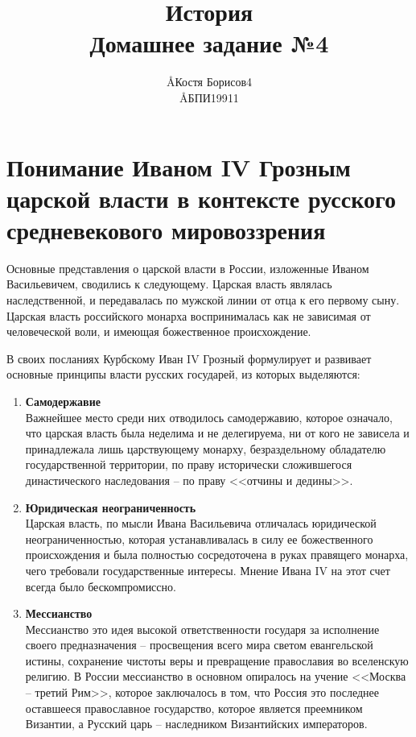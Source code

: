 \documentclass[12pt]{article}
\title{История \\ Домашнее задание №4}
\author{\AA{Костя Борисов}{4} \\ \AA{БПИ199}{11}}
\newcommand{\red}[1]{{\color{red}{#1}}}
\begin{document}
  \maketitle
  \setcounter{section}{1}

  \section{Понимание Иваном IV Грозным царской власти в контексте русского средневекового мировоззрения}

  Основные представления о царской власти в России, изложенные Иваном Васильевичем, сводились к следующему.
  Царская власть являлась наследственной, и передавалась по мужской линии от отца к его первому сыну.
  Царская власть российского монарха воспринималась как не зависимая от человеческой воли, и имеющая божественное происхождение.

  В своих посланиях Курбскому Иван IV Грозный формулирует и развивает основные принципы власти русских государей, из которых выделяются:

  \begin{enumerate}[label=\textbf{\large\arabic*}]
    \item {\bf\large Самодержавие} \\
    Важнейшее место среди них отводилось самодержавию, которое означало,
    что царская власть была неделима и не делегируема, ни от кого не зависела и принадлежала лишь царствующему монарху,
    безраздельному обладателю государственной территории,
    по праву исторически сложившегося династического наследования -- по праву <<отчины и дедины>>.

    \item {\bf\large Юридическая неограниченность} \\
    Царская власть, по мысли Ивана Васильевича отличалась юридической неограниченностью,
    которая устанавливалась в силу ее божественного происхождения и была полностью сосредоточена в руках правящего монарха,
    чего требовали государственные интересы.
    Мнение Ивана IV на этот счет всегда было бескомпромиссно.

    \item {\bf\large Мессианство} \\
    Мессианство это идея высокой ответственности государя за исполнение своего предназначения --
    просвещения всего мира светом евангельской истины, сохранение чистоты веры и превращение православия во вселенскую религию.
    В России мессианство в основном опиралось на учение <<Москва -- третий Рим>>, которое заключалось в том, что
    Россия это последнее оставшееся православное государство, которое является преемником Византии,
    а Русский царь -- наследником Византийских императоров.
  \end{enumerate}
\end{document}
